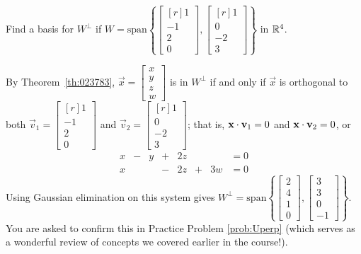 \documentclass{ximera}
\begin{document}
\begin{example}\label{ex:023829}
Find a basis for $W^\perp$ if $W = \mbox{span}\left\{\begin{bmatrix*}[r]
  1 \\ -1 \\ 2 \\ 0
  \end{bmatrix*},
  \begin{bmatrix*}[r]
  1 \\ 0 \\ -2 \\ 3
  \end{bmatrix*}\right\}$ in $\mathbb{R}^4$.

\begin{explanation}
  By Theorem~\ref{th:023783}, $\vec{x} = \begin{bmatrix}
  x \\ y \\ z \\ w
  \end{bmatrix}$
  is in $W^\perp$ if and only if $\vec{x}$ is orthogonal to both 
  $\vec{v}_1 = \begin{bmatrix*}[r]
  1 \\ -1 \\ 2 \\ 0
  \end{bmatrix*}$ and
  $\vec{v}_2 = \begin{bmatrix*}[r]
  1 \\ 0 \\ -2 \\ 3
  \end{bmatrix*}$; that is,
  $\mathbf{x} \cdot \mathbf{v}_1 = 0$ and $\mathbf{x} \cdot \mathbf{v}_2 = 0$, or
\begin{equation*}
\begin{array}{rrrrrrrr}
x & - & y & + & 2z & & & =0\\
x & & & - & 2z & +& 3w & =0
\end{array}
\end{equation*}
Using Gaussian elimination on this system gives $W^\perp = \mbox{span}\left\{\begin{bmatrix}
  2 \\ 4 \\ 1 \\ 0
  \end{bmatrix},
  \begin{bmatrix}
  3 \\ 3 \\ 0 \\ -1
  \end{bmatrix}\right\}$.  You are asked to confirm this in Practice Problem \ref{prob:Uperp} (which serves as a wonderful review of concepts we covered earlier in the course!).  
\end{explanation}
\end{example}
\end{document}
